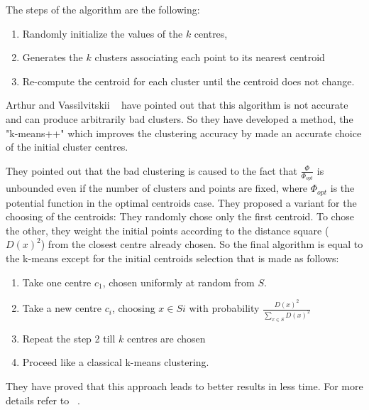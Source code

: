 \documentclass{standalone}
\begin{document}
	The steps of the algorithm are the following: 
		\begin{enumerate}
			\item Randomly initialize the values of the $k$ centres,
			\item Generates the $k$ clusters associating each point to its nearest centroid
			\item Re-compute the centroid for each cluster until the centroid does not change.
			
		\end{enumerate}
		
	Arthur and Vassilvitskii ~\cite{Arthur2007} have pointed out that this algorithm is not accurate and can produce arbitrarily bad clusters. So they have developed a method, the "k-means++" which improves the clustering accuracy by made an accurate choice of the initial cluster centres.

	They pointed out that the bad clustering is caused to the fact that $\frac{\Phi}{\Phi_{opt}}$ is unbounded even if the number of clusters and points are fixed, where $\Phi_{opt}$ is the potential function in the optimal centroids case. They proposed a variant for the choosing of the centroids: They randomly chose only the first centroid. To chose the other, they weight the initial points according to the distance square ($D(x)^2$) from the closest centre already chosen. So the final algorithm is equal to the k-means except for the initial centroids selection that is made as follows: 
	\begin{enumerate}
			\item Take one centre $c_1$, chosen uniformly at random from $S$.
			
			\item  Take a new centre $c_i$, choosing $x \in Si$ with probability $\frac{D(x)^2}{\sum _{x \in S} D(x)^2}$
			
			\item Repeat the step 2 till $k$ centres are chosen
			
			\item Proceed like a classical k-means clustering.
			
		\end{enumerate}
		
	They have proved that this approach leads to better results in less time. For more details refer to ~\cite{Arthur2007}.
	
\end{document}
